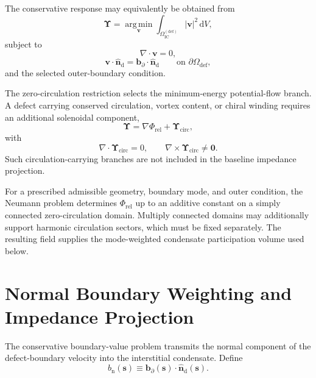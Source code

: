 The conservative response may equivalently be obtained from
\begin{equation}
    \boldsymbol\Upsilon
    =
    \operatorname*{arg\,min}_{\mathbf v}
    \int_{\Omega_{\mathrm{IC}}^{(\mathrm{def})}}
    |\mathbf v|^2\,\mathrm dV,
\end{equation}
subject to
\begin{equation}
    \nabla\cdot\mathbf v=0,
\end{equation}
\begin{equation}
    \mathbf v\cdot\hat{\mathbf n}_{\mathrm d}
    =
    \mathbf b_{\partial}\cdot\hat{\mathbf n}_{\mathrm d}
    \qquad
    \text{on }\partial\Omega_{\mathrm{def}},
\end{equation}
and the selected outer-boundary condition.

The zero-circulation restriction selects the minimum-energy potential-flow branch. A defect carrying conserved circulation, vortex content, or chiral winding requires an additional solenoidal component,
\begin{equation}
    \boldsymbol\Upsilon
    =
    \nabla\Phi_{\mathrm{rel}}
    +\boldsymbol\Upsilon_{\mathrm{circ}},
\end{equation}
with
\begin{equation}
    \nabla\cdot\boldsymbol\Upsilon_{\mathrm{circ}}=0,
    \qquad
    \nabla\times\boldsymbol\Upsilon_{\mathrm{circ}}\neq\mathbf0.
\end{equation}
Such circulation-carrying branches are not included in the baseline impedance projection.

For a prescribed admissible geometry, boundary mode, and outer condition, the Neumann problem determines \(\Phi_{\mathrm{rel}}\) up to an additive constant on a simply connected zero-circulation domain. Multiply connected domains may additionally support harmonic circulation sectors, which must be fixed separately. The resulting field supplies the mode-weighted condensate participation volume used below.

\section[Normal Boundary Impedance Projection]{Normal Boundary Weighting and Impedance Projection}
\label{sec:AP_normal_boundary_impedance}

The conservative boundary-value problem transmits the normal component of the defect-boundary velocity into the interstitial condensate. Define
\begin{equation}
    b_{\mathrm{n}}(\boldsymbol{s})\equiv\mathbf{b}_{\partial}(\boldsymbol{s})\cdot\hat{\mathbf{n}}_{\mathrm{d}}(\boldsymbol{s}).
\end{equation}

